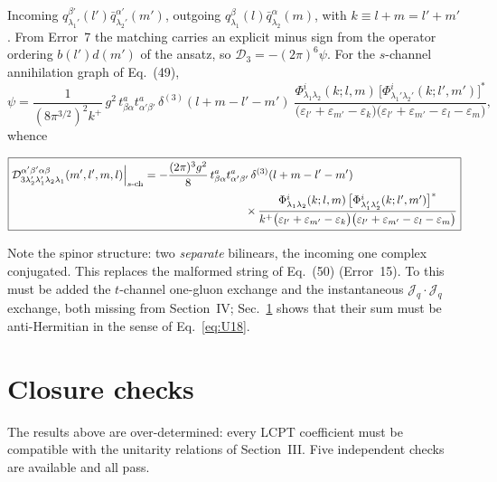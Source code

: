 \documentclass[11pt]{article}
\newcommand{\eps}{\varepsilon}
\newcommand{\dthree}{\delta^{(3)}}
\newcommand{\Ph}{\Phi}
\newcommand{\qk}[3]{q^{#1}_{#2}(#3)}
\newcommand{\aqk}[3]{\bar q^{#1}_{#2}(#3)}
\begin{document}
Incoming $\qk{\beta'}{\lambda_1'}{l'}\aqk{\alpha'}{\lambda_2'}{m'}$, outgoing
$\qk{\beta}{\lambda_1}{l}\aqk{\alpha}{\lambda_2}{m}$, with $k\equiv l+m=l'+m'$. From Error~7 the
matching carries an explicit minus sign from the operator ordering
$b(l')d(m')$ of the ansatz, so $\mathcal D_{3}=-(2\pi)^{6}\psi$. For the $s$-channel annihilation
graph of Eq.~(49),
\begin{equation}
\psi=\frac{1}{(8\pi^{3/2})^{2}k^{+}}\,g^{2}\,t^{a}_{\beta\alpha}t^{a}_{\alpha'\beta'}\,
\dthree(l+m-l'-m')\;
\frac{\Ph^{i}_{\lambda_1\lambda_2}(k;l,m)\,\big[\Ph^{i}_{\lambda_1'\lambda_2'}(k;l',m')\big]^{*}}
{\big(\eps_{l'}+\eps_{m'}-\eps_{k}\big)\big(\eps_{l'}+\eps_{m'}-\eps_{l}-\eps_{m}\big)},
\end{equation}
whence

\begin{res}
\begin{equation}
\boxed{
\begin{aligned}
\mathcal D^{\alpha'\beta'\alpha\beta}_{3\lambda_2'\lambda_1'\lambda_2\lambda_1}(m',l',m,l)
\Big|_{s\text{-ch}}=
-\frac{(2\pi)^{3}g^{2}}{8}\,t^{a}_{\beta\alpha}t^{a}_{\alpha'\beta'}\,
\dthree(l+m-l'-m')\hspace{3.2cm}
\\[2pt]
\times\,
\frac{\Ph^{i}_{\lambda_1\lambda_2}(k;l,m)\,\big[\Ph^{i}_{\lambda_1'\lambda_2'}(k;l',m')\big]^{*}}
{k^{+}\big(\eps_{l'}+\eps_{m'}-\eps_{k}\big)\big(\eps_{l'}+\eps_{m'}-\eps_{l}-\eps_{m}\big)}
\end{aligned}}
\label{eq:D3res}
\end{equation}
\end{res}

\noindent
Note the spinor structure: two \emph{separate} bilinears, the incoming one complex conjugated.
This replaces the malformed string of Eq.~(50) (Error~15). To this must be added the $t$-channel
one-gluon exchange and the instantaneous $\mathcal J_{q}\!\cdot\!\mathcal J_{q}$ exchange, both
missing from Section~IV; Sec.~\ref{sec:checks} shows that their sum must be anti-Hermitian in the
sense of Eq.~\eqref{eq:U18}.

\section{Closure checks}
\label{sec:checks}

The results above are over-determined: every LCPT coefficient must be compatible with the
unitarity relations of Section~III. Five independent checks are available and all pass.
\end{document}
